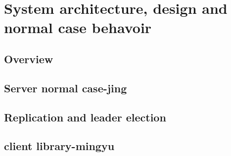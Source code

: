 \section{System architecture, design and normal case behavoir}
\subsection{Overview}


\subsection{Server normal case-jing}


\subsection{Replication and leader election}


\subsection{client library-mingyu}
